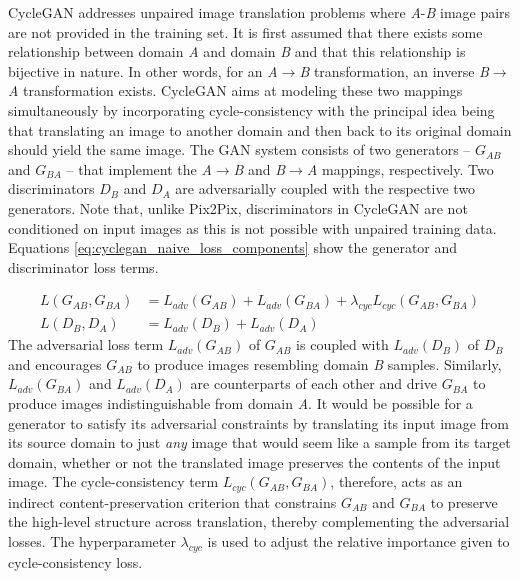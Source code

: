 CycleGAN addresses unpaired image translation problems where \textit{A}-\textit{B} image pairs are not provided in the training set. It is first assumed that there exists some relationship between domain \textit{A} and domain \textit{B} and that this relationship is bijective in nature. In other words, for an \textit{A}$\rightarrow$\textit{B} transformation, an inverse \textit{B}$\rightarrow$\textit{A} transformation exists. CycleGAN aims at modeling these two mappings simultaneously by incorporating cycle-consistency with the principal idea being that translating an image to another domain and then back to its original domain should yield the same image.  The GAN system consists of two generators -- $G_{AB}$ and $G_{BA}$ -- that implement the \textit{A}$\rightarrow$\textit{B} and \textit{B}$\rightarrow$\textit{A} mappings, respectively. Two discriminators $D_B$ and $D_A$ are adversarially coupled with the respective two generators. Note that, unlike Pix2Pix, discriminators in CycleGAN are not conditioned on input images as this is not possible with unpaired training data. Equations \ref{eq:cyclegan_naive_loss_components} show the generator and discriminator loss terms.

\begin{equation}
    \begin{aligned}
    L(G_{AB}, G_{BA}) &= L_{adv}(G_{AB}) + L_{adv}(G_{BA}) + \lambda_{cyc} L_{cyc}(G_{AB}, G_{BA}) \\[1mm]
    L(D_B, D_A) &= L_{adv}(D_B) + L_{adv}(D_A)
    \end{aligned}
    \label{eq:cyclegan_naive_loss_components}
\end{equation}
The adversarial loss term $L_{adv}(G_{AB})$ of $G_{AB}$ is coupled with $L_{adv}(D_B)$ of $D_B$ and encourages $G_{AB}$ to produce images resembling domain \textit{B} samples. Similarly, $L_{adv}(G_{BA})$ and $L_{adv}(D_A)$ are counterparts of each other and drive $G_{BA}$ to produce images indistinguishable from domain \textit{A}. It would be possible for a generator to satisfy its adversarial constraints by translating its input image from its source domain to just \textit{any} image that would seem like a sample from its target domain, whether or not the translated image preserves the contents of the input image. The cycle-consistency term $L_{cyc}(G_{AB}, G_{BA})$, therefore, acts as an indirect content-preservation criterion that constrains $G_{AB}$ and $G_{BA}$ to preserve the high-level structure across translation, thereby complementing the adversarial losses. The hyperparameter $\lambda_{cyc}$ is used to adjust the relative importance given to cycle-consistency loss. 

